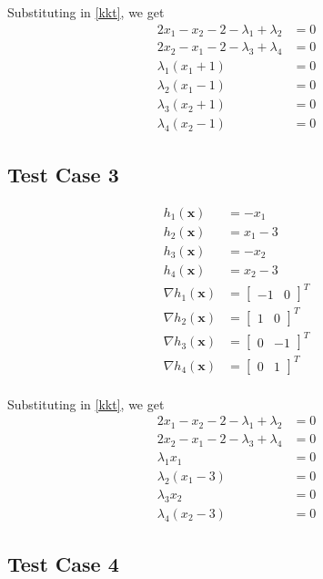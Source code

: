 \documentclass[a4paper]{article}
\begin{document}
Substituting in \eqref{kkt}, we get
\begin{align*}
2 x_1 - x_2 - 2 - \lambda_1 + \lambda_2 &= 0 \\
2 x_2 - x_1 - 2 - \lambda_3 + \lambda_4 &= 0 \\
\lambda_1 (x_1 + 1) &= 0 \\
\lambda_2 (x_1 - 1) &= 0 \\
\lambda_3 (x_2 + 1) &= 0 \\
\lambda_4 (x_2 - 1) &= 0
\end{align*}

\subsection{Test Case 3}

\begin{align*}
h_1(\textbf{x}) &= - x_1 \\
h_2(\textbf{x}) &= x_1 - 3 \\
h_3(\textbf{x}) &= - x_2 \\
h_4(\textbf{x}) &= x_2 - 3 \\
\nabla h_1(\textbf{x}) &= \begin{bmatrix} -1 & 0 \end{bmatrix} ^T \\
\nabla h_2(\textbf{x}) &= \begin{bmatrix} 1 & 0 \end{bmatrix} ^T \\
\nabla h_3(\textbf{x}) &= \begin{bmatrix} 0 & -1 \end{bmatrix} ^T \\
\nabla h_4(\textbf{x}) &= \begin{bmatrix} 0 & 1 \end{bmatrix} ^T \\
\end{align*}

Substituting in \eqref{kkt}, we get
\begin{align*}
2 x_1 - x_2 - 2 - \lambda_1 + \lambda_2 &= 0 \\
2 x_2 - x_1 - 2 - \lambda_3 + \lambda_4 &= 0 \\
\lambda_1 x_1 &= 0 \\
\lambda_2 (x_1 - 3) &= 0 \\
\lambda_3 x_2 &= 0 \\
\lambda_4 (x_2 - 3) &= 0
\end{align*}

\subsection{Test Case 4}
\end{document}
